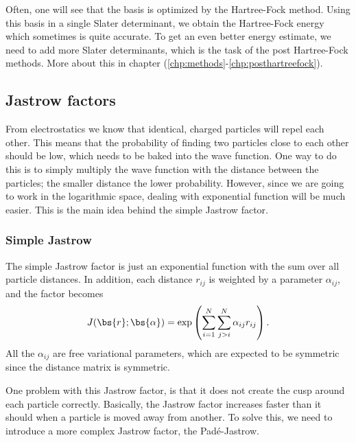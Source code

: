 Often, one will see that the basis is optimized by the Hartree-Fock method. Using this basis in a single Slater determinant, we obtain the Hartree-Fock energy which sometimes is quite accurate. To get an even better energy estimate, we need to add more Slater determinants, which is the task of the post Hartree-Fock methods. More about this in chapter (\ref{chp:methods}-\ref{chp:posthartreefock}).

\subsection{Jastrow factors} \label{subsubsec:jastrow}
From electrostatics we know that identical, charged particles will repel each other. This means that the probability of finding two particles close to each other should be low, which needs to be baked into the wave function. One way to do this is to simply multiply the wave function with the distance between the particles; the smaller distance the lower probability. However, since we are going to work in the logarithmic space, dealing with exponential function will be much easier. This is the main idea behind the simple Jastrow factor.

\subsubsection{Simple Jastrow}
The simple Jastrow factor is just an exponential function with the sum over all particle distances. In addition, each distance $r_{ij}$ is weighted by a parameter $\alpha_{ij}$, and the factor becomes
\begin{equation}
J(\bs{r}; \bs{\alpha}) = \exp\left(\sum_{i=1}^N\sum_{j>i}^N{\alpha_{ij}r_{ij}}\right).
\label{eq:SimpleJastrow}
\end{equation}
All the $\alpha_{ij}$ are free variational parameters, which are expected to be symmetric since the distance matrix is symmetric.

One problem with this Jastrow factor, is that it does not create the cusp around each particle correctly. Basically, the Jastrow factor increases faster than it should when a particle is moved away from another. To solve this, we need to introduce a more complex Jastrow factor, the Padé-Jastrow.

